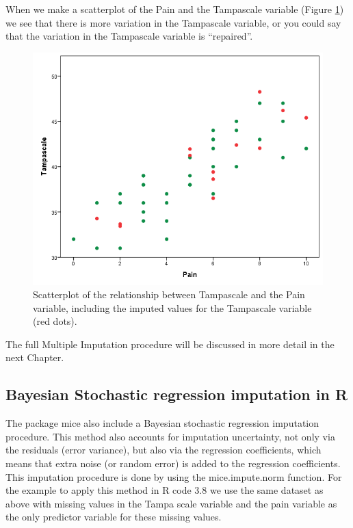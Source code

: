 \documentclass[]{book}
\theoremstyle{definition}
\theoremstyle{definition}
\theoremstyle{definition}
\theoremstyle{remark}
\begin{document}
When we make a scatterplot of the Pain and the Tampascale variable
(Figure \ref{fig:fig3-24}) we see that there is more variation in the
Tampascale variable, or you could say that the variation in the
Tampascale variable is ``repaired''.

\begin{figure}

{\centering \includegraphics[width=0.9\linewidth]{images/fig3.24} 

}

\caption{Scatterplot of the relationship between Tampascale and the Pain variable, including the imputed values for the Tampascale variable (red dots).}\label{fig:fig3-24}
\end{figure}

The full Multiple Imputation procedure will be discussed in more detail
in the next Chapter.

\subsection{Bayesian Stochastic regression imputation in
R}\label{bayesian-stochastic-regression-imputation-in-r}

The package mice also include a Bayesian stochastic regression
imputation procedure. This method also accounts for imputation
uncertainty, not only via the residuals (error variance), but also via
the regression coefficients, which means that extra noise (or random
error) is added to the regression coefficients. This imputation
procedure is done by using the mice.impute.norm function. For the
example to apply this method in R code 3.8 we use the same dataset as
above with missing values in the Tampa scale variable and the pain
variable as the only predictor variable for these missing values.
\end{document}
